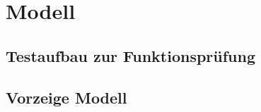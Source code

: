 
\chapter{Modell}
\label{sec:modelle}

\section{Testaufbau zur Funktionsprüfung}
\label{sec:Bsp}




\section{Vorzeige Modell}
\label{sec:Bsp}

